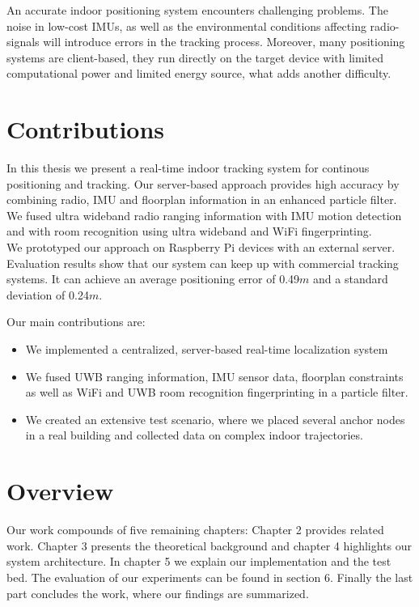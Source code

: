 \noindent\hspace*{5mm}%
An accurate indoor positioning system encounters challenging problems. The noise in low-cost IMUs, as well as the environmental conditions affecting radio-signals will introduce errors in the tracking process. Moreover, many positioning systems are client-based, they run directly on the target device with limited computational power and limited energy source, what adds another difficulty.



\section{Contributions}

In this thesis we present a real-time indoor tracking system for continous positioning and tracking. Our server-based approach provides high accuracy by combining radio, IMU and floorplan information in an enhanced particle filter. We fused ultra wideband radio ranging information with IMU motion detection and with room recognition using ultra wideband and WiFi fingerprinting. \\
\noindent\hspace*{5mm}%
We prototyped our approach on Raspberry Pi devices with an external server.
Evaluation results show that our system can keep up with commercial tracking systems. It can achieve an average positioning error of 0.49$m$ and a standard deviation of 0.24$m$.

Our main contributions are:
\begin{itemize}
\item We implemented a centralized, server-based real-time localization system
\item We fused UWB ranging information, IMU sensor data, floorplan constraints as well as WiFi and UWB room recognition fingerprinting in a particle filter. 
\item We created an extensive test scenario, where we placed several anchor nodes in a real building and collected data on complex indoor trajectories. 
\end{itemize}




\section{Overview}

Our work compounds of five remaining chapters:
Chapter 2 provides related work. Chapter 3 presents the theoretical background and chapter 4 highlights our system architecture. In chapter 5 we explain our implementation and the test bed. The evaluation of our experiments can be found in section 6. Finally the last part concludes the work, where our findings are summarized.